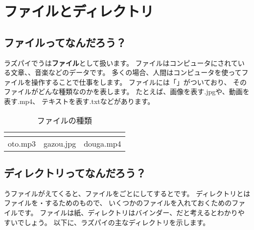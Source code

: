 \newpage
\section{ファイルとディレクトリ}
\subsection{ファイルってなんだろう？}
ラズパイでうは{\bf ファイル}として扱います。
ファイルはコンピュータにされている文章、、音楽などのデータです。
多くの場合、人間はコンピュータを使ってファイルを操作することで仕事をします。
ファイルには「」がついており、
そのファイルがどんな種類なのかを表します。
たとえば、画像を表す.jpgや、動画を表す.mp4、
テキストを表す.txtなどがあります。

\begin{table}[H]
  \begin{center}
    \caption[tab:files]{ファイルの種類}
    \begin{tabular}{|c|c|c|} \hline
    \begin{minipage}{0.12\hsize}
      \begin{center}
        
      \end{center}  
    \end{minipage} & 
    \begin{minipage}{0.12\hsize}
      \begin{center}
        
      \end{center}
    \end{minipage} &
    \begin{minipage}{0.12\hsize}
      \begin{center}
        
      \end{center} 
    \end{minipage} \\ \hline
    oto.mp3 & gazou.jpg & douga.mp4 \\ \hline
  \end{tabular}
 \end{center}
\end{table}

\subsection{ディレクトリってなんだろう？}
うファイルがえてくると、ファイルをごとにしてするとです。
ディレクトリとはファイルを・するためのもので、
いくつかのファイルを入れておくためのファイルです。
ファイルは紙、ディレクトリはバインダー、だと考えるとわかりやすいでしょう。
以下に、ラズパイの主なディレクトリを示します。

